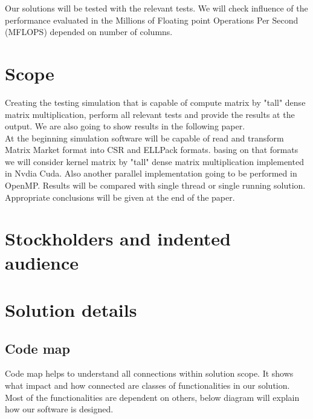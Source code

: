 \documentclass{scrreprt}
\begin{document}
Our solutions will be tested with the relevant tests. We will check influence of the performance evaluated in the Millions of Floating point Operations Per Second (MFLOPS) depended on number of columns. 

\section{Scope}
Creating the testing simulation that is capable of compute matrix by "tall" dense matrix multiplication, perform all relevant tests and provide the results at the output. We are also going to show results in the following paper. 
\\
At the beginning simulation software will be capable of read and transform Matrix Market format into CSR and ELLPack formats. basing on that formats we will consider kernel matrix by "tall" dense matrix multiplication implemented in Nvdia Cuda. Also another parallel implementation going to be performed in OpenMP. Results will be compared with single thread or single running solution.
\\
Appropriate conclusions will be given at the end of the paper.

\section{Stockholders and indented audience}



\section{Solution details}

\subsection{Code map}

Code map helps to understand all connections  within solution scope. It shows what impact and how connected are classes of functionalities in our solution. Most of the functionalities are dependent on others, below diagram will explain how our software is designed.
\end{document}
